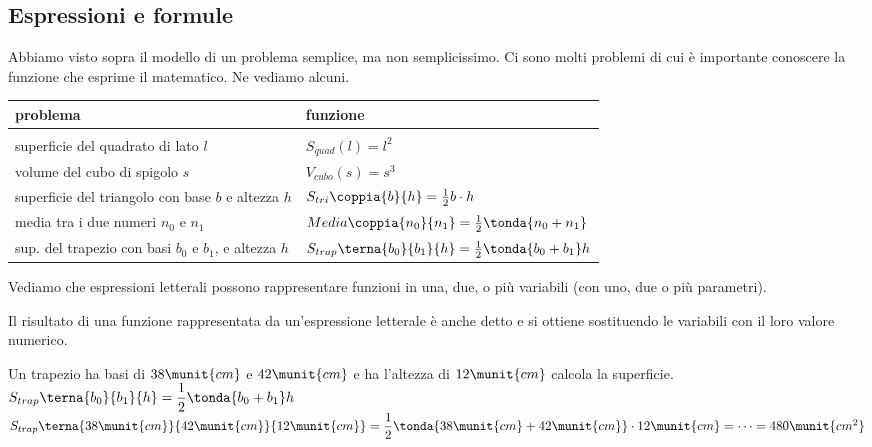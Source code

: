 \subsection{Espressioni e formule}
\label{subsec:calclett_formule}

Abbiamo visto sopra il modello di un problema semplice, 
ma non semplicissimo.
Ci sono molti problemi di cui è importante conoscere la funzione che 
esprime il  matematico.
Ne vediamo alcuni.

\begin{center}
\begin{tabular}{ll}
problema & funzione\\
\hline\\
superficie del quadrato di lato \(l\) & \(S_{quad}(l) = l^2\)\\[.5em]
volume del cubo di spigolo \(s\) & \(V_{cubo} (s) = s^3\) \\[.5em]
superficie del triangolo con base \(b\) e altezza \(h\) & 
\(S_{tri}\coppia{b}{h} = \frac{1}{2} b \cdot h\) \\[.5em]
media tra i due numeri \(n_0\) e \(n_1\) & 
\(Media\coppia{n_0}{n_1} = \frac{1}{2}\tonda{n_0 + n_1}\) \\[.5em]
sup. del trapezio con basi \(b_0\) e \(b_1\), e altezza \(h\) & 
\(S_{trap}\terna{b_0}{b_1}{h} = \frac{1}{2} \tonda{b_0 + b_1} h\) \\[1em]
\hline
\end{tabular}
\end{center}

Vediamo che espressioni letterali possono rappresentare funzioni in una, 
due, o più variabili (con uno, due o più parametri).

Il risultato di una funzione rappresentata da un'espressione letterale è 
anche detto  e si ottiene 
sostituendo le variabili con il loro valore numerico.

\begin{esempio}{}{}
Un trapezio ha basi di \(38\munit{cm}\) e \(42\munit{cm}\) e ha l'altezza 
di \(12\munit{cm}\) calcola la superficie.\\
\(S_{trap}\terna{b_0}{b_1}{h} = \dfrac{1}{2} \tonda{b_0 + b_1} h\)\\
\(S_{trap}\terna{38\munit{cm}}{42\munit{cm}}{12\munit{cm}} = 
  \dfrac{1}{2} \tonda{38\munit{cm} + 42\munit{cm}} \cdot 12\munit{cm} =
  \dots =
  480\munit{cm^2}
\)
\end{esempio}

